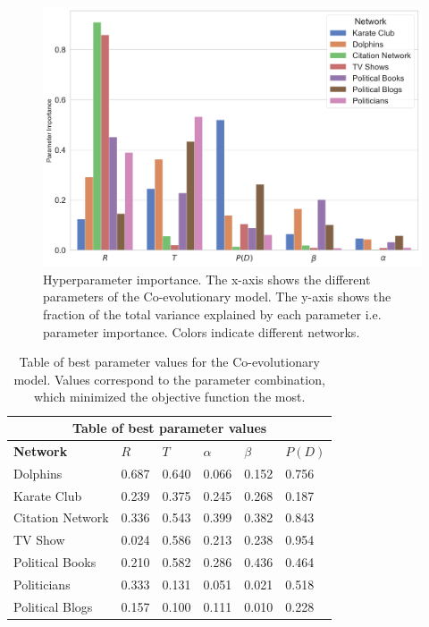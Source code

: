 \documentclass[11pt]{article}
\begin{document}
\begin{figure}[H]
    \centering
    \includegraphics[width=.9\linewidth]{../plots/overall/Parameter_Importance.png}
  \caption{Hyperparameter importance. The x-axis shows the different parameters of the Co-evolutionary model. The y-axis shows the fraction of the total variance explained by each parameter i.e. parameter importance. Colors indicate different networks.}
  \label{fig:eval_importance}
\end{figure}

\begin{table}[H]
\begin{center}
    
\begin{tabular}{ |p{3cm}||p{2cm}|p{2cm}|p{2cm}|p{2cm}|p{2cm}|}
    \hline
    \multicolumn{6}{|c|}{Table of best parameter values} \\
    \hline
    \bf{Network} & $R$ & $T$ & $\alpha$ & $\beta$ & $P(D)$\\
    \hline
    Dolphins   & 0.687    &0.640&   0.066&   0.152&   0.756\\
    Karate Club&   0.239  & 0.375   &0.245&   0.268&   0.187\\
    Citation Network   &0.336 & 0.543&  0.399&   0.382&   0.843\\
    TV Show & 0.024 & 0.586 & 0.213 & 0.238 & 0.954 \\
    Political Books &0.210 & 0.582&  0.286&   0.436&   0.464\\
    Politicians&   0.333  & 0.131 &0.051&   0.021&   0.518\\
    Political Blogs & 0.157  & 0.100   &0.111&   0.010&   0.228\\
    \hline
\end{tabular}
\end{center}
\caption{Table of best parameter values for the Co-evolutionary model. Values correspond to the parameter combination, which minimized the objective function the most.}
\label{table:best_params}
\end{table}
\end{document}
